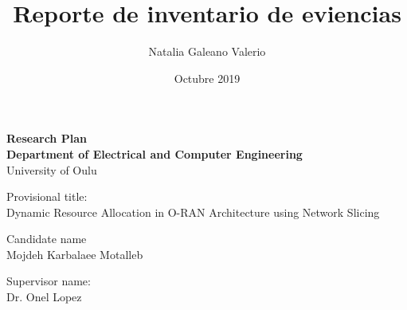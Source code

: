 \documentclass{article}
\title{Reporte de inventario de eviencias}
\author{Natalia Galeano Valerio}
\date{Octubre 2019}
\begin{document}
\baselineskip 12pt

\vspace*{30mm}

\begin{center}

\textbf{\Large Research Plan} \\
\vspace{10mm}
\textbf{Department of Electrical and Computer Engineering}\\
\vspace{20mm}
{\large University of Oulu}\\
\vspace{20mm}
\end{center}
\vspace{10mm}
{\scriptsize Provisional title:}\\
Dynamic Resource Allocation in O-RAN Architecture using Network Slicing\\

\vspace{20mm}

{\scriptsize Candidate name}\\
Mojdeh Karbalaee Motalleb \\
\vspace{3mm}



{\scriptsize Supervisor name:}\\
Dr. Onel Lopez\\
\vspace{3mm}
\end{document}
